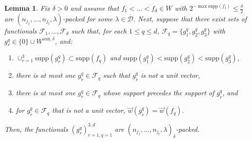 \documentclass[12pt,a4paper]{amsart}
\newcommand{\supp}{\text{supp}}
\theoremstyle{definition}
\theoremstyle{plain}
\newtheorem{lemma}[question]{Lemma}
\begin{document}
\begin{lemma}{\label{basic_lemma}}
Fix $\delta>0$ and assume that $f_{1}<\ldots<f_{d}\in W$ with $2^{-\max\supp(f_{1})}\leq\frac{\delta}{2}$ are $(n_{j_{1}},\ldots,n_{j_{l}},\lambda)$-packed for some $\lambda\in\overline{\mathcal{D}}$. Next, suppose that there exist sets of functionals $\mathcal{F}_{1},\ldots,\mathcal{F}_{d}$ such that, for each $1\leq q\leq d$, $\mathcal{F}_{q}=\{g^{q}_{1},g^{q}_{2},g^{q}_{3}\}$ with $g^{q}_{r}\in \{0\}\cup W^{\text{aux},\delta}$, and:
\begin{enumerate}
\item $\cup_{r=1}^{3}\supp(g^{q}_{r})\subset\supp(f_{q})$ and $\supp(g^{q}_{1})<\supp(g^{q}_{2})<\supp(g^{q}_{3})$,
\item there is at most one $g^{q}_{\tilde{r}}\in\mathcal{F}_{q}$ such that $g^{q}_{\tilde{r}}$ is not a unit vector,
\item there is at most one $g^{q}_{r}\in\mathcal{F}_{q}$ whose support precedes the support of $g^{q}_{\tilde{r}}$, and
\item for $g^q_{\tilde r}\in \mathcal{F}_q$ that is not a unit vector,  $\vec w(g^{q}_{\tilde{r}})=\vec w(f_{q})$.
\end{enumerate}
Then, the functionals $(g^{q}_{r})_{r=1,q=1}^{3,d}$ are $(n_{j_{1}},\ldots,n_{j_{l}},\lambda)_{\delta}$-packed.
\end{lemma}
\end{document}
